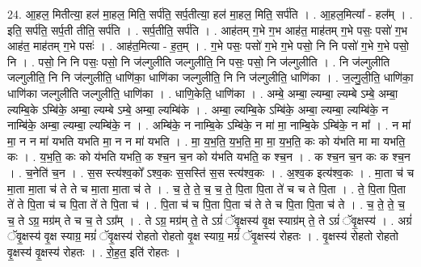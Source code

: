 \documentclass[17pt]{extarticle}
\begin{document}
24. आ॒हल॒ मितीत्या॒ हल॑ मा॒हल॒ मिति॒ सर्प॑ति॒ सर्प॒तीत्या॒ हल॑ मा॒हल॒ मिति॒ सर्प॑ति । . आ॒हल॒मित्या᳚ - हल᳚म् । . इति॒ सर्प॑ति॒ सर्प॒ती तीति॒ सर्प॑ति । . सर्प॒तीति॒ सर्प॑ति । . आह॑तम् ग॒भे ग॒भ आह॑त॒ माह॑तम् ग॒भे पसः॒ पसो॑ ग॒भ आह॑त॒ माह॑तम् ग॒भे पसः॑ । . आह॑त॒मित्या - ह॒त॒म् । . ग॒भे पसः॒ पसो॑ ग॒भे ग॒भे पसो॒ नि नि पसो॑ ग॒भे ग॒भे पसो॒ नि । . पसो॒ नि नि पसः॒ पसो॒ नि ज॑ल्गुलीति जल्गुलीति॒ नि पसः॒ पसो॒ नि ज॑ल्गुलीति । . नि ज॑ल्गुलीति जल्गुलीति॒ नि नि ज॑ल्गुलीति॒ धाणि॑का॒ धाणि॑का जल्गुलीति॒ नि नि ज॑ल्गुलीति॒ धाणि॑का । . ज॒ल्गु॒ली॒ति॒ धाणि॑का॒ धाणि॑का जल्गुलीति जल्गुलीति॒ धाणि॑का । . धाणि॒केति॒ धाणि॑का । . अम्बे॒ अम्बा॒ ल्यम्बा॒ ल्यम्बे ऽम्बे॒ अम्बा॒ ल्यम्बि॒के ऽम्बि॑के॒ अम्बा॒ ल्यम्बे ऽम्बे॒ अम्बा॒ ल्यम्बि॑के । . अम्बा॒ ल्यम्बि॒के ऽम्बि॑के॒ अम्बा॒ ल्यम्बा॒ ल्यम्बि॑के॒ न नाम्बि॑के॒ अम्बा॒ ल्यम्बा॒ ल्यम्बि॑के॒ न । . अम्बि॑के॒ न नाम्बि॒के ऽम्बि॑के॒ न मा॑ मा॒ नाम्बि॒के ऽम्बि॑के॒ न मा᳚ । . न मा॑ मा॒ न न मा॑ यभति यभति मा॒ न न मा॑ यभति । . मा॒ य॒भ॒ति॒ य॒भ॒ति॒ मा॒ मा॒ य॒भ॒ति॒ कः को य॑भति मा मा यभति॒ कः । . य॒भ॒ति॒ कः को य॑भति यभति॒ क श्च॒न च॒न को य॑भति यभति॒ क श्च॒न । . क श्च॒न च॒न कः क श्च॒न । . च॒नेति॑ च॒न । . स॒स स्त्य॑श्व॒को᳚ ऽश्व॒कः स॒सस्ति॑ स॒स स्त्य॑श्व॒कः । . अ॒श्व॒क इत्य॑श्व॒कः । . मा॒ता च॑ च मा॒ता मा॒ता च॑ ते ते च मा॒ता मा॒ता च॑ ते । . च॒ ते॒ ते॒ च॒ च॒ ते॒ पि॒ता पि॒ता ते॑ च च ते पि॒ता । . ते॒ पि॒ता पि॒ता ते॑ ते पि॒ता च॑ च पि॒ता ते॑ ते पि॒ता च॑ । . पि॒ता च॑ च पि॒ता पि॒ता च॑ ते ते च पि॒ता पि॒ता च॑ ते । . च॒ ते॒ ते॒ च॒ च॒ ते ऽग्र॒ मग्र॑म् ते च च॒ ते ऽग्र᳚म् । . ते ऽग्र॒ मग्र॑म् ते॒ ते ऽग्रं॑ ॅवृ॒क्षस्य॑ वृ॒क्ष स्याग्र॑म् ते॒ ते ऽग्रं॑ ॅवृ॒क्षस्य॑ । . अग्रं॑ ॅवृ॒क्षस्य॑ वृ॒क्ष स्याग्र॒ मग्रं॑ ॅवृ॒क्षस्य॑ रोहतो रोहतो वृ॒क्ष स्याग्र॒ मग्रं॑ ॅवृ॒क्षस्य॑ रोहतः । . वृ॒क्षस्य॑ रोहतो रोहतो वृ॒क्षस्य॑ वृ॒क्षस्य॑ रोहतः । . रो॒ह॒त॒ इति॑ रोहतः । \newline
\pagebreak
{}
\end{document}
